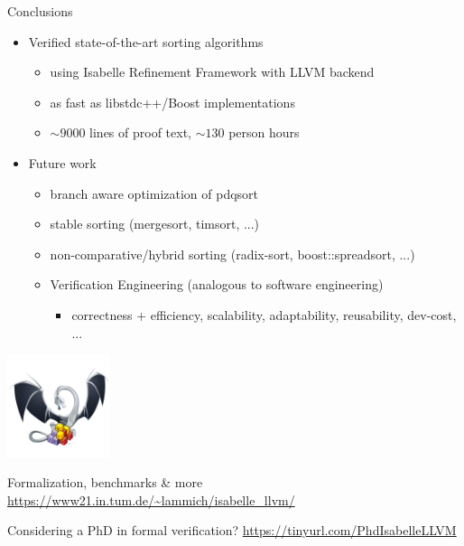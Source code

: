 \documentclass[fleqn]{beamer}
\begin{document}
\begin{frame}{Conclusions}
  \begin{itemize}
   \item Verified state-of-the-art sorting algorithms
    \begin{itemize}
     \item using Isabelle Refinement Framework with LLVM backend
     \item as fast as libstdc++/Boost implementations
     \item $\sim9000$ lines of proof text, $\sim130$ person hours
    \end{itemize}
   \item Future work
    \begin{itemize}
     \item branch aware optimization of pdqsort
     \item stable sorting (mergesort, timsort, ...)
     \item non-comparative/hybrid sorting (radix-sort, boost::spreadsort, ...)
      \medskip
     \item Verification Engineering (analogous to software engineering)
      \begin{itemize}
       \item {\color{green} correctness} + efficiency, scalability, adaptability, reusability, dev-cost, ...

      \end{itemize}
    \end{itemize}
  \end{itemize}
  \vfill

  \includegraphics[width=3cm,align=c]{isabelle-llvm.png}~~\begin{minipage}{.7\textwidth}
    \color{black}Formalization, benchmarks \& more\\
    \url{https://www21.in.tum.de/~lammich/isabelle_llvm/}
  \end{minipage}

  \vfill
  Considering a PhD in formal verification? \url{https://tinyurl.com/PhdIsabelleLLVM}

\end{frame}
\end{document}
